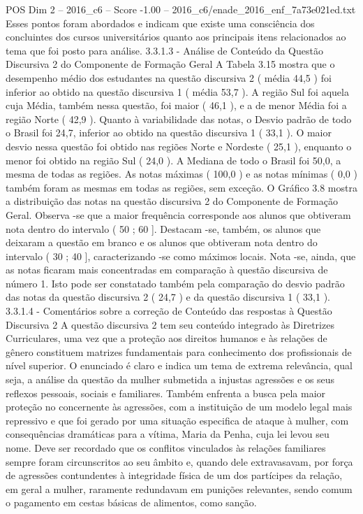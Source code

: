 \begin{textsample}{POS Dim 2 – 2016\_c6 – Score -1.00 – 2016\_c6/enade\_2016\_enf\_7a73e021ed.txt}
Esses pontos foram abordados e indicam que existe uma consciência dos concluintes dos cursos universitários quanto aos principais itens relacionados ao tema que foi posto para análise. 3.3.1.3 - Análise de Conteúdo da Questão Discursiva 2 do Componente de Formação Geral A Tabela 3.15 mostra que o desempenho médio dos estudantes na questão discursiva 2 ( média 44,5 ) foi inferior ao obtido na questão discursiva 1 ( média 53,7 ).
A região Sul foi aquela cuja Média, também nessa questão, foi maior ( 46,1 ), e a de menor Média foi a região Norte ( 42,9 ).
Quanto à variabilidade das notas, o Desvio padrão de todo o Brasil foi 24,7, inferior ao obtido na questão discursiva 1 ( 33,1 ).
O maior desvio nessa questão foi obtido nas regiões Norte e Nordeste ( 25,1 ), enquanto o menor foi obtido na região Sul ( 24,0 ).
A Mediana de todo o Brasil foi 50,0, a mesma de todas as regiões.
As notas máximas ( 100,0 ) e as notas mínimas ( 0,0 ) também foram as mesmas em todas as regiões, sem exceção.
O Gráfico 3.8 mostra a distribuição das notas na questão discursiva 2 do Componente de Formação Geral.
Observa -se que a maior frequência corresponde aos alunos que obtiveram nota dentro do intervalo ( 50 ; 60 ].
Destacam -se, também, os alunos que deixaram a questão em branco e os alunos que obtiveram nota dentro do intervalo ( 30 ; 40 ], caracterizando -se como máximos locais.
Nota -se, ainda, que as notas ficaram mais concentradas em comparação à questão discursiva de número 1.
Isto pode ser constatado também pela comparação do desvio padrão das notas da questão discursiva 2 ( 24,7 ) e da questão discursiva 1 ( 33,1 ). 3.3.1.4 - Comentários sobre a correção de Conteúdo das respostas à Questão Discursiva 2 A questão discursiva 2 tem seu conteúdo integrado às Diretrizes Curriculares, uma vez que a proteção aos direitos humanos e às relações de gênero constituem matrizes fundamentais para conhecimento dos profissionais de nível superior.
O enunciado é claro e indica um tema de extrema relevância, qual seja, a análise da questão da mulher submetida a injustas agressões e os seus reflexos pessoais, sociais e familiares.
Também enfrenta a busca pela maior proteção no concernente às agressões, com a instituição de um modelo legal mais repressivo e que foi gerado por uma situação especifica de ataque à mulher, com consequências dramáticas para a vítima, Maria da Penha, cuja lei levou seu nome.
Deve ser recordado que os conflitos vinculados às relações familiares sempre foram circunscritos ao seu âmbito e, quando dele extravasavam, por força de agressões contundentes à integridade física de um dos partícipes da relação, em geral a mulher, raramente redundavam em punições relevantes, sendo comum o pagamento em cestas básicas de alimentos, como sanção.

\end{textsample}
